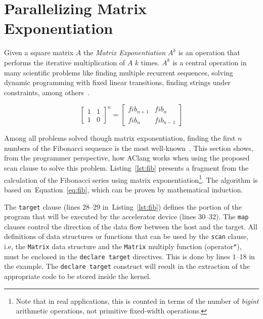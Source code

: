 \documentclass[Ingles]{ic-tese-v1}
\newcommand{\req}[1]{Equation~\ref{eq:#1}}
\newcommand{\ttt}[1]{{\texttt{#1}}}
\newcommand{\rlst}[1]{Listing~\ref{lst:#1}}
\begin{document}
\section{Parallelizing Matrix Exponentiation}
\label{sec:fibonacci}

Given a square matrix $A$ the \textit{Matrix Exponentiation} $A^k$ is an operation
that performs the iterative multiplication of $A$ $k$ times. $A^k$ is a central
operation in many scientific problems like finding multiple recurrent sequences,
solving dynamic programming with fixed linear transitions, finding strings under
constraints, among others~\cite{doi:10}.

\begin{equation}
\begin{bmatrix}1 & 1 \\ 1 & 0\end{bmatrix}^{n}
= \begin{bmatrix}fib_{n+1} & fib_{n}\\fib_{n} &
fib_{n-1}\end{bmatrix}
\label{eq:fib}
\end{equation}

Among all problems solved though matrix exponentiation, finding the first $n$
numbers of the Fibonacci sequence is the most well-known~\cite{fibonacci}.
This section shows, from the programmer perspective,    how AClang works   when
using the proposed scan clause to solve this problem. \rlst{fib}  presents a
fragment from  the calculation  of the  Fibonacci series  using matrix
exponentiation\footnote{Note  that  in   real  applications,  this  is
	counted in terms of the  number of \textit{bigint} arithmetic operations, not
	primitive  fixed-width  operations.}. The algorithm  is  based  on~\req{fib},
which can be proven by mathematical induction.

The \ttt{target} clause (lines 28--29 in~\rlst{fib}) defines the portion of the
program  that will  be  executed by  the  accelerator device  (lines
30--32).  The \ttt{map}  clauses control the direction  of the data flow
between the host and the  target. All definitions of data structures
or functions  that can be used  by the \ttt{scan} clause,  i.e, the
\ttt{Matrix} data  structure and the \ttt{Matrix}  multiply function
(operator$*$),  must   be  enclosed  in  the   \ttt{declare  target}
directives. This is done by lines 1--18 in the example.  The \ttt{declare  target}
construct  will result in  the extraction of  the appropriate
code to be stored inside the kernel.
\end{document}

